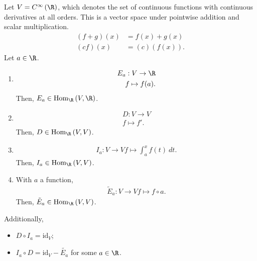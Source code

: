 \documentclass[12pt]{mypackage}
\begin{document}
\begin{example}
  Let $V = C^{\infty}\left(\R\right)$, which denotes the set of continuous functions with continuous derivatives at all orders. This is a vector space under pointwise addition and scalar multiplication.
  \begin{align*}
    (f+g)\left(x\right) &= f(x) + g(x)\\
    (cf)(x) &= (c)\left(f(x)\right).
  \end{align*}
  Let $a\in \R$.
  \begin{enumerate}[(1)]
    \item 
\begin{align*}
  E_a: V\rightarrow \R\\
  f \mapsto f(a).
\end{align*}
Then, $E_a \in \text{Hom}_{\R}\left(V,\R\right)$.
\item
  \begin{align*}
    D: V\rightarrow V\\
    f\mapsto f'.
  \end{align*}
  Then, $D\in \text{Hom}_{\R}\left(V,V\right)$.
\item 
  \begin{align*}
    I_a: V\rightarrow V
    f\mapsto \int_{a}^{x} f(t)\:dt.
  \end{align*}
  Then, $I_a\in \text{Hom}_{\R}\left(V,V\right)$.
\item With $a$ a function,
  \begin{align*}
    \tilde{E}_a: V\rightarrow V
    f\mapsto f\circ a.
  \end{align*}
  Then, $\tilde{E}_{a}\in \text{Hom}_{\R}\left(V,V\right)$.
  \end{enumerate}
  Additionally,
  \begin{itemize}
    \item $D\circ I_a = \text{id}_V$;
    \item $I_a\circ D = \text{id}_V - \tilde{E_a}$ for some $a\in \R$.
  \end{itemize}
\end{example}
\end{document}
